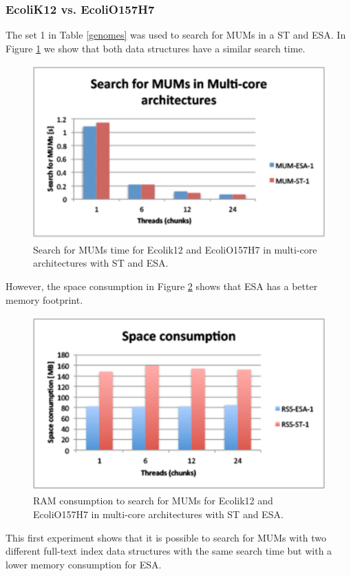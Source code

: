 \documentclass{acm_proc_article-sp}
\begin{document}
\subsubsection{EcoliK12 vs. EcoliO157H7}
The set 1 in Table \ref{genomes} was used to search for MUMs in a ST and ESA. In Figure \ref{fig:ecoli-mum} we show that both data structures have a similar search time.
\begin{figure}[h]
  \centering
  \includegraphics[scale=0.65]{ecoli-MUM.eps}
  \caption{Search for MUMs time for Ecolik12 and EcoliO157H7 in multi-core architectures with ST and ESA.}
  \label{fig:ecoli-mum}
\end{figure}  
However, the space consumption in Figure \ref{fig:ecoli-ram} shows that ESA has a better memory footprint.
\begin{figure}[h]
  \centering
  \includegraphics[scale=0.65]{ecoli-RAM.eps}
  \caption{RAM consumption to search for MUMs for Ecolik12 and EcoliO157H7 in multi-core architectures with ST and ESA.}
  \label{fig:ecoli-ram}
\end{figure}  
This first experiment shows that it is possible to search for MUMs with two different full-text index data structures with the same search time but with a lower memory consumption for ESA.
\end{document}
